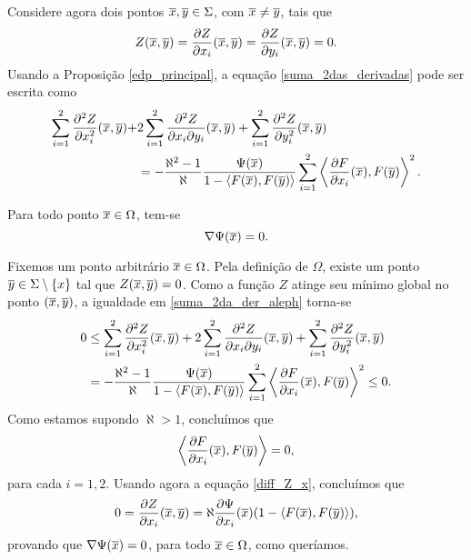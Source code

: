 Considere agora dois pontos $\overline{x},\overline{y}\in\Sigma$, com $\overline{x}\neq\overline{y}$,
tais que
\[
Z(\overline{x},\overline{y}) = \frac{\partial Z}{\partial x_i}(\overline{x},\overline{y}) 
= \frac{\partial Z}{\partial y_i}(\overline{x},\overline{y}) = 0.
\]
Usando a Proposi\c c\~ao \ref{edp_principal}, a equação
\eqref{suma_2das_derivadas} pode ser escrita como
\begin{equation} \label{suma_2da_der_aleph}
\begin{aligned}
\sum_{i=1}^2 \frac{\partial^2 Z}{\partial x_i^2}(\overline{x},\overline{y}) + & 
2 \sum_{i=1}^2 \frac{\partial^2 Z}{\partial x_i \partial y_i}(\overline{x},\overline{y}) + 
\sum_{i=1}^2 \frac{\partial^2 Z}{\partial y_i^2}(\overline{x},\overline{y})  \\
& = - 
\frac{\aleph^2 - 1}{\aleph} \frac{\Psi(\overline{x})}{1 - \langle F(\overline{x}), 
F(\overline{y}) \rangle} \sum_{i=1}^2 \left\langle \frac{\partial F}
{\partial x_i}(\overline{x}), F(\overline{y}) \right\rangle^2.
\end{aligned}
\end{equation}



\begin{proposicao} \label{gradiente_nulo}
Para todo ponto $\overline{x}\in\Omega$, tem-se
\[
\nabla \Psi(\overline{x})=0.
\] 
\end{proposicao}
\begin{demonstracao}
Fixemos um ponto arbitr\'ario $\overline{x}\in\Omega$. Pela defini\c c\~ao
de $\Omega$, existe um ponto $\overline{y}\in\Sigma\setminus\{x\}$ tal que 
$Z(\overline{x},\overline{y})=0$. Como a fun\c c\~ao $Z$ atinge seu m\'inimo
global no ponto $(\overline{x},\overline{y})$, a igualdade em 
\eqref{suma_2da_der_aleph} torna-se
\begin{equation*} 
\begin{aligned}
0 & \leq
\sum_{i=1}^2 \frac{\partial^2 Z}{\partial x_i^2}(\overline{x},\overline{y}) + 
2 \sum_{i=1}^2 \frac{\partial^2 Z}{\partial x_i \partial y_i}(\overline{x},\overline{y}) + 
\sum_{i=1}^2 \frac{\partial^2 Z}{\partial y_i^2}(\overline{x},\overline{y})  \\
& = - 
\frac{\aleph^2 - 1}{\aleph} \frac{\Psi(\overline{x})}{1 - \langle F(\overline{x}), 
F(\overline{y}) \rangle} \sum_{i=1}^2 \left\langle \frac{\partial F}
{\partial x_i}(\overline{x}), F(\overline{y}) \right\rangle^2 \leq 0.
\end{aligned}
\end{equation*}
Como estamos supondo $\aleph>1$, conclu\'imos que
\[
\left\langle \frac{\partial F}{\partial x_i}(\overline{x}), F(\overline{y}) \right\rangle = 0,
\]
para cada $i=1,2$. Usando agora a equação \eqref{diff_Z_x},
conclu\'imos que 
\[
0 = \frac{\partial Z}{\partial x_i}(\overline{x},\overline{y}) = 
\aleph \frac{\partial \Psi}{\partial x_i}(\overline{x})
(1 - \langle F(\overline{x}),F(\overline{y}) \rangle),
\]
provando que $\nabla\Psi(\overline{x})=0$, para todo $\overline{x}\in\Omega$, como
quer\'iamos.
\end{demonstracao}

